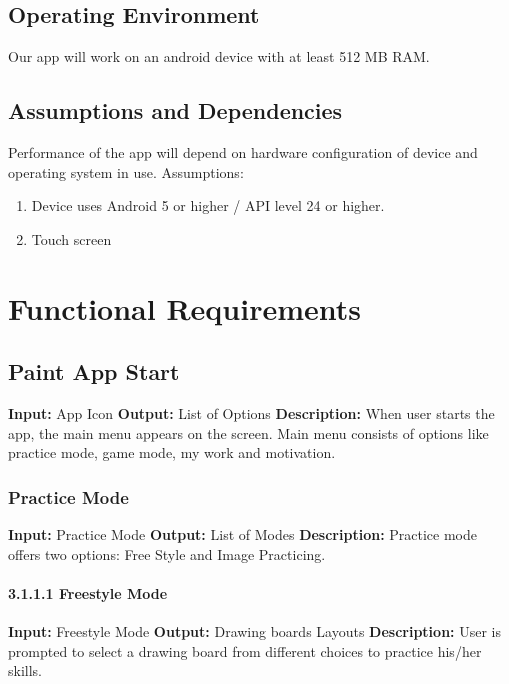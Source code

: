 \documentclass{scrreprt}
\begin{document}
\section{Operating Environment}
Our app will work on an android device with at least 512 MB RAM.

\section{Assumptions and Dependencies}
Performance of the app will depend on hardware configuration of device and operating system in use.
Assumptions:
\begin{enumerate}[itemsep=0.5pt]
    \item Device uses Android 5 or higher / API level 24 or higher.
    \item Touch screen
\end{enumerate}

\chapter{Functional Requirements}
\section{Paint App Start}
\textbf{Input:} App Icon \newline
\textbf{Output:} List of Options
\vspace{1mm}\newline
\textbf{Description:} \newline 
When user starts the app, the main menu appears on the screen. Main menu consists of options like practice mode, game mode, my work and motivation.

\subsection{Practice Mode}
\textbf{Input:} Practice Mode \newline
\textbf{Output:} List of Modes
\vspace{1mm}\newline
\textbf{Description:} \newline 
Practice mode offers two options:  Free Style and Image Practicing.

\subsubsection{3.1.1.1 Freestyle Mode}
\textbf{Input:} Freestyle Mode \newline
\textbf{Output:} Drawing boards Layouts
\vspace{1mm}\newline
\textbf{Description:} \newline 
User is prompted to select a drawing board from different choices to practice his/her skills.
\end{document}
